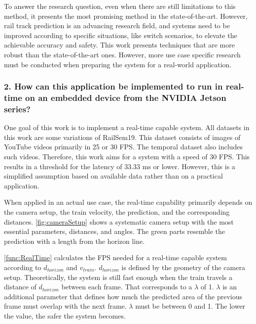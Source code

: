 To answer the research question, even when there are still limitations to this method, it presents the most promising method in the state-of-the-art.
However, rail track prediction is an advancing research field, and systems need to be improved according to specific situations, like switch scenarios, to elevate the achievable accuracy and safety.
This work presents techniques that are more robust than the state-of-the-art ones.
However, more use case specific research must be conducted when preparing the system for a real-world application.

\subsubsection{2. How can this application be implemented to run in real-time on an embedded device from the NVIDIA Jetson series?}

One goal of this work is to implement a real-time capable system.
All datasets in this work are some variations of RailSem19.
This dataset consists of images of YouTube videos primarily in 25 or 30 \ac{FPS}.
The temporal dataset also includes such videos.
Therefore, this work aims for a system with a speed of 30 \ac{FPS}.
This results in a threshold for the latency of 33.33 ms or lower.
However, this is a simplified assumption based on available data rather than on a practical application.

When applied in an actual use case, the real-time capability primarily depends on the camera setup, the train velocity, the prediction, and the corresponding distances.
\autoref{fig:cameraSetup} shows a systematic camera setup with the most essential parameters, distances, and angles.
The green parts resemble the prediction with a length from the horizon line.

\autoref{func:RealTime} calculates the \ac{FPS} needed for a real-time capable system according to $d_{horizon}$ and $v_{train}$.
$d_{horizon}$ is defined by the geometry of the camera setup.
Theoretically, the system is still fast enough when the train travels a distance of $d_{horizon}$ between each frame.
That corresponds to a $\lambda$ of 1.
$\lambda$ is an additional parameter that defines how much the predicted area of the previous frame must overlap with the next frame.
$\lambda$ must be between 0 and 1.
The lower the value, the safer the system becomes.

